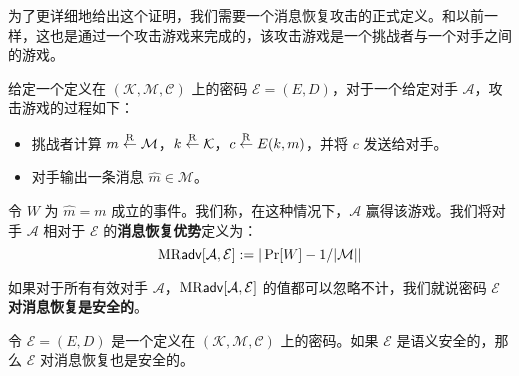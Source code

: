 为了更详细地给出这个证明，我们需要一个消息恢复攻击的正式定义。和以前一样，这也是通过一个攻击游戏来完成的，该攻击游戏是一个挑战者与一个对手之间的游戏。

\begin{game}[消息恢复]\label{game:2-2}
给定一个定义在 $(\mathcal{K},\mathcal{M},\mathcal{C})$ 上的密码 $\mathcal{E}=(E,D)$，对于一个给定对手 $\mathcal{A}$，攻击游戏的过程如下：
\begin{itemize}
	\item 挑战者计算 $m\overset{\rm R}\leftarrow\mathcal{M}$，$k\overset{\rm R}\leftarrow\mathcal{K}$，$c\overset{\rm R}\leftarrow E(k,m)$，并将 $c$ 发送给对手。
	\item 对手输出一条消息 $\hat m\in\mathcal{M}$。
\end{itemize}
令 $W$ 为 $\hat m=m$ 成立的事件。我们称，在这种情况下，$\mathcal{A}$ 赢得该游戏。我们将对手 $\mathcal{A}$ 相对于 $\mathcal{E}$ 的\textbf{消息恢复优势}定义为：
$$
{\rm MR\mathsf{adv}}[\mathcal{A},\mathcal{E}]:=|\Pr[W] -{1}/{|\mathcal{M}|}|
$$
\end{game}

\begin{definition}[针对消息恢复的安全性]
如果对于所有有效对手 $\mathcal{A}$，${\rm MR\mathsf{adv}}[\mathcal{A},\mathcal{E}]$ 的值都可以忽略不计，我们就说密码 $\mathcal{E}$ \textbf{对消息恢复是安全的}。
\end{definition}

\begin{theorem}\label{theo:2-7}
令 $\mathcal{E}=(E,D)$ 是一个定义在 $(\mathcal{K},\mathcal{M},\mathcal{C})$ 上的密码。如果 $\mathcal{E}$ 是语义安全的，那么 $\mathcal{E}$ 对消息恢复也是安全的。
\end{theorem}

